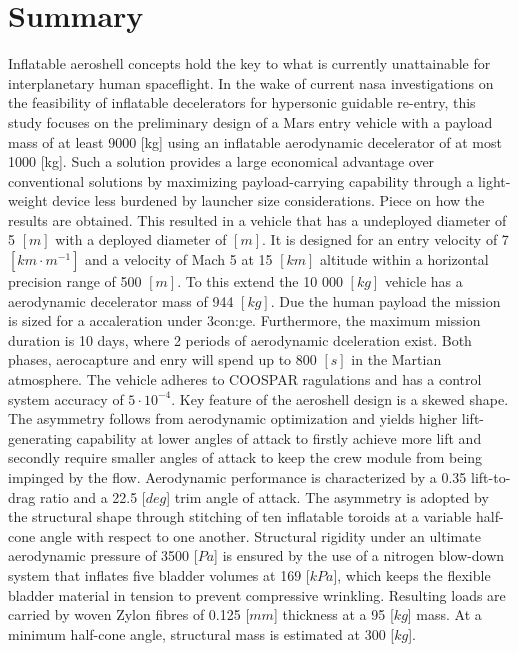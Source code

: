 \section*{Summary}\label{cha:summary}
Inflatable aeroshell concepts hold the key to what is currently unattainable for interplanetary human spaceflight. In the wake of current \acrfull{nasa} investigations on the feasibility of inflatable decelerators for hypersonic guidable re-entry, this study focuses on the preliminary design of a Mars entry vehicle with a payload mass of at least 9000 [kg] using an inflatable aerodynamic decelerator of at most 1000 [kg]. Such a solution provides a large economical advantage over conventional solutions by maximizing payload-carrying capability through a light-weight device less burdened by launcher size considerations.
\newline
\newline
Piece on how the results are obtained.
\newline
\newline
This resulted in a vehicle that has a undeployed diameter of 5 $ \left[ m \right] $ with a deployed diameter of $ \left[ m \right] $. It is designed for an entry velocity of 7 $ \left[ km \cdot m^{-1} \right] $ and a velocity of Mach 5 at  15 $ \left[ km \right] $ altitude within a horizontal precision range of 500 $ \left[ m \right] $. To this extend the 10 000 $ \left[ kg \right] $ vehicle has a aerodynamic decelerator mass of 944 $ \left[ kg \right] $. Due the human payload the mission is sized for a accaleration under 3\gls{con:ge}. Furthermore, the maximum mission duration is 10 days, where 2 periods of aerodynamic dceleration exist. Both phases, aerocapture and enry will spend up to 800 $ \left[ s \right] $ in the Martian atmosphere. The vehicle adheres to COOSPAR ragulations and has a control system accuracy of $ 5 \cdot 10^{-4} $.
\newline
\newline
Key feature of the aeroshell design is a skewed shape. The asymmetry follows from aerodynamic optimization and yields higher lift-generating capability at lower angles of attack to firstly achieve more lift and secondly require smaller angles of attack to keep the crew module from being impinged by the flow. Aerodynamic performance is characterized by a 0.35 lift-to-drag ratio and a 22.5 [$deg$] trim angle of attack.
\newline
\newline
The asymmetry is adopted by the structural shape through stitching of ten inflatable toroids at a variable half-cone angle with respect to one another. Structural rigidity under an ultimate aerodynamic pressure of 3500 [$Pa$] is ensured by the use of a nitrogen blow-down system that inflates five bladder volumes at 169 [$kPa$], which keeps the flexible bladder material in tension to prevent compressive wrinkling. Resulting loads are carried by woven Zylon fibres of 0.125 [$mm$] thickness at a 95 [$kg$] mass. At a minimum half-cone angle,  structural mass is estimated at 300 [$kg$]. 
